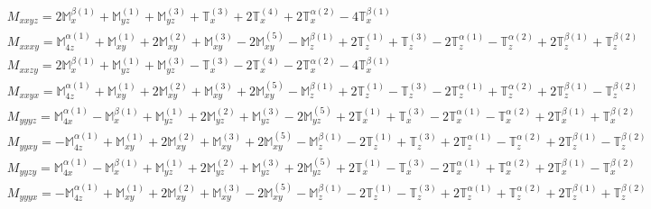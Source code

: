 \documentclass[fleqn,8pt,landscape]{jsarticle}
\begin{document}
\begin{align*}
& M_{xxyz} = 2 \mathbb{M}_{x}^{\beta(1)} + \mathbb{M}_{yz}^{(1)} + \mathbb{M}_{yz}^{(3)} + \mathbb{T}_{x}^{(3)} + 2 \mathbb{T}_{x}^{(4)} + 2 \mathbb{T}_{x}^{\alpha(2)} - 4 \mathbb{T}_{x}^{\beta(1)} \\
& M_{xxxy} = \mathbb{M}_{4z}^{\alpha(1)} + \mathbb{M}_{xy}^{(1)} + 2 \mathbb{M}_{xy}^{(2)} + \mathbb{M}_{xy}^{(3)} - 2 \mathbb{M}_{xy}^{(5)} - \mathbb{M}_{z}^{\beta(1)} + 2 \mathbb{T}_{z}^{(1)} + \mathbb{T}_{z}^{(3)} - 2 \mathbb{T}_{z}^{\alpha(1)} - \mathbb{T}_{z}^{\alpha(2)} + 2 \mathbb{T}_{z}^{\beta(1)} + \mathbb{T}_{z}^{\beta(2)} \\
& M_{xxzy} = 2 \mathbb{M}_{x}^{\beta(1)} + \mathbb{M}_{yz}^{(1)} + \mathbb{M}_{yz}^{(3)} - \mathbb{T}_{x}^{(3)} - 2 \mathbb{T}_{x}^{(4)} - 2 \mathbb{T}_{x}^{\alpha(2)} - 4 \mathbb{T}_{x}^{\beta(1)} \\
& M_{xxyx} = \mathbb{M}_{4z}^{\alpha(1)} + \mathbb{M}_{xy}^{(1)} + 2 \mathbb{M}_{xy}^{(2)} + \mathbb{M}_{xy}^{(3)} + 2 \mathbb{M}_{xy}^{(5)} - \mathbb{M}_{z}^{\beta(1)} + 2 \mathbb{T}_{z}^{(1)} - \mathbb{T}_{z}^{(3)} - 2 \mathbb{T}_{z}^{\alpha(1)} + \mathbb{T}_{z}^{\alpha(2)} + 2 \mathbb{T}_{z}^{\beta(1)} - \mathbb{T}_{z}^{\beta(2)} \\
& M_{yyyz} = \mathbb{M}_{4x}^{\alpha(1)} - \mathbb{M}_{x}^{\beta(1)} + \mathbb{M}_{yz}^{(1)} + 2 \mathbb{M}_{yz}^{(2)} + \mathbb{M}_{yz}^{(3)} - 2 \mathbb{M}_{yz}^{(5)} + 2 \mathbb{T}_{x}^{(1)} + \mathbb{T}_{x}^{(3)} - 2 \mathbb{T}_{x}^{\alpha(1)} - \mathbb{T}_{x}^{\alpha(2)} + 2 \mathbb{T}_{x}^{\beta(1)} + \mathbb{T}_{x}^{\beta(2)} \\
& M_{yyxy} = - \mathbb{M}_{4z}^{\alpha(1)} + \mathbb{M}_{xy}^{(1)} + 2 \mathbb{M}_{xy}^{(2)} + \mathbb{M}_{xy}^{(3)} + 2 \mathbb{M}_{xy}^{(5)} - \mathbb{M}_{z}^{\beta(1)} - 2 \mathbb{T}_{z}^{(1)} + \mathbb{T}_{z}^{(3)} + 2 \mathbb{T}_{z}^{\alpha(1)} - \mathbb{T}_{z}^{\alpha(2)} + 2 \mathbb{T}_{z}^{\beta(1)} - \mathbb{T}_{z}^{\beta(2)} \\
& M_{yyzy} = \mathbb{M}_{4x}^{\alpha(1)} - \mathbb{M}_{x}^{\beta(1)} + \mathbb{M}_{yz}^{(1)} + 2 \mathbb{M}_{yz}^{(2)} + \mathbb{M}_{yz}^{(3)} + 2 \mathbb{M}_{yz}^{(5)} + 2 \mathbb{T}_{x}^{(1)} - \mathbb{T}_{x}^{(3)} - 2 \mathbb{T}_{x}^{\alpha(1)} + \mathbb{T}_{x}^{\alpha(2)} + 2 \mathbb{T}_{x}^{\beta(1)} - \mathbb{T}_{x}^{\beta(2)} \\
& M_{yyyx} = - \mathbb{M}_{4z}^{\alpha(1)} + \mathbb{M}_{xy}^{(1)} + 2 \mathbb{M}_{xy}^{(2)} + \mathbb{M}_{xy}^{(3)} - 2 \mathbb{M}_{xy}^{(5)} - \mathbb{M}_{z}^{\beta(1)} - 2 \mathbb{T}_{z}^{(1)} - \mathbb{T}_{z}^{(3)} + 2 \mathbb{T}_{z}^{\alpha(1)} + \mathbb{T}_{z}^{\alpha(2)} + 2 \mathbb{T}_{z}^{\beta(1)} + \mathbb{T}_{z}^{\beta(2)} \\

\end{align*}
\end{document}
